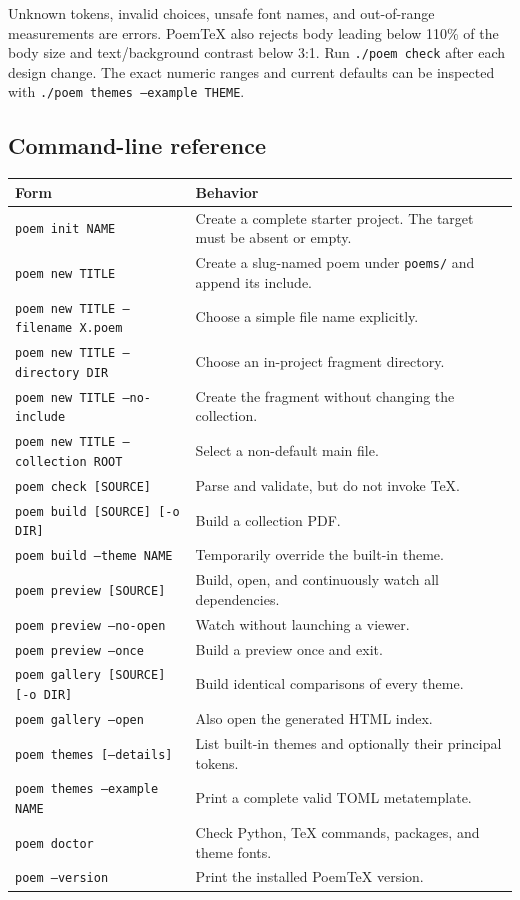 \documentclass[11pt,a4paper]{article}
\newcommand{\code}[1]{\texttt{#1}}
\begin{document}
Unknown tokens, invalid choices, unsafe font names, and out-of-range measurements
are errors. PoemTeX also rejects body leading below 110\% of the body size and
text/background contrast below 3:1. Run \code{./poem check} after each design
change. The exact numeric ranges and current defaults can be inspected with
\code{./poem themes --example THEME}.

\subsection{Command-line reference}

\begin{longtable}{@{}L{0.37\textwidth}L{0.57\textwidth}@{}}
\toprule
\textbf{Form} & \textbf{Behavior} \\
\midrule
\endhead
\code{poem init NAME} & Create a complete starter project. The target must be absent or empty. \\
\code{poem new TITLE} & Create a slug-named poem under \code{poems/} and append its include. \\
\code{poem new TITLE --filename X.poem} & Choose a simple file name explicitly. \\
\code{poem new TITLE --directory DIR} & Choose an in-project fragment directory. \\
\code{poem new TITLE --no-include} & Create the fragment without changing the collection. \\
\code{poem new TITLE --collection ROOT} & Select a non-default main file. \\
\code{poem check [SOURCE]} & Parse and validate, but do not invoke TeX. \\
\code{poem build [SOURCE] [-o DIR]} & Build a collection PDF. \\
\code{poem build --theme NAME} & Temporarily override the built-in theme. \\
\code{poem preview [SOURCE]} & Build, open, and continuously watch all dependencies. \\
\code{poem preview --no-open} & Watch without launching a viewer. \\
\code{poem preview --once} & Build a preview once and exit. \\
\code{poem gallery [SOURCE] [-o DIR]} & Build identical comparisons of every theme. \\
\code{poem gallery --open} & Also open the generated HTML index. \\
\code{poem themes [--details]} & List built-in themes and optionally their principal tokens. \\
\code{poem themes --example NAME} & Print a complete valid TOML metatemplate. \\
\code{poem doctor} & Check Python, TeX commands, packages, and theme fonts. \\
\code{poem --version} & Print the installed PoemTeX version. \\
\bottomrule
\end{longtable}
\end{document}
